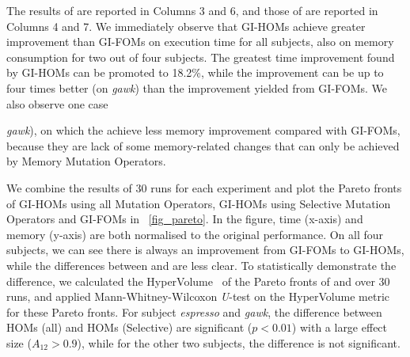 \documentclass[oribibl]{llncs}
\begin{document}
The results of \homss{} are reported in Columns 3 and 6, and those of \homsa{} are reported in Columns 4 and 7. We immediately observe that GI-HOMs achieve greater improvement than GI-FOMs on execution time for all subjects, also on memory consumption for two out of four subjects. The greatest time improvement found by GI-HOMs can be promoted to 18.2\%, while the improvement can be up to four times better (on \emph{gawk}) than the improvement yielded from GI-FOMs. We also observe one case {\emph{gawk}), on which the \homss{} achieve less memory improvement compared with GI-FOMs, because they are lack of some memory-related changes that can only be achieved by Memory Mutation Operators. 




We combine the results of 30 runs for each experiment and plot the Pareto fronts of GI-HOMs using all Mutation Operators, GI-HOMs using Selective Mutation Operators and GI-FOMs in \figurename~\ref{fig_pareto}.
In the figure, time (x-axis) and memory (y-axis) are both normalised to the original performance.
On all four subjects, we can see there is always an improvement from GI-FOMs to GI-HOMs, while the differences between \homss{} and \homsa{} are less clear. 
To statistically demonstrate the difference, we calculated the HyperVolume~\cite{797969} of the Pareto fronts of \homsa{} and \homss{} over 30 runs, and applied Mann-Whitney-Wilcoxon \emph{U}-test on the HyperVolume metric for these Pareto fronts. For subject \emph{espresso} and \emph{gawk}, the difference between HOMs (all) and HOMs (Selective) are significant ($p<0.01$) with a large effect size ($A_{12} > 0.9$), while for the other two subjects, the difference is not significant.

}
\end{document}
